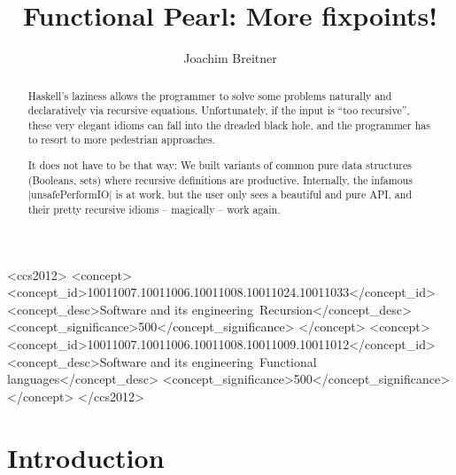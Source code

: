 \documentclass[manuscript,anonymous,screen,acmsmall]{acmart}
\begin{document}
\title{Functional Pearl: More fixpoints!}

\author{Joachim Breitner}


\begin{abstract}
Haskell’s laziness allows the programmer to solve some problems naturally and declaratively via recursive equations. Unfortunately, if the input is “too recursive”, these very elegant idioms can fall into the dreaded black hole, and the programmer has to resort to more pedestrian approaches.

It does not have to be that way: We built variants of common pure data structures (Booleans, sets) where recursive definitions are productive. Internally, the infamous |unsafePerformIO| is at work, but the user only sees a beautiful and pure API, and their pretty recursive idioms -- magically -- work again.

\end{abstract}

\begin{CCSXML}
<ccs2012>
   <concept>
       <concept_id>10011007.10011006.10011008.10011024.10011033</concept_id>
       <concept_desc>Software and its engineering~Recursion</concept_desc>
       <concept_significance>500</concept_significance>
       </concept>
   <concept>
       <concept_id>10011007.10011006.10011008.10011009.10011012</concept_id>
       <concept_desc>Software and its engineering~Functional languages</concept_desc>
       <concept_significance>500</concept_significance>
       </concept>
 </ccs2012>
\end{CCSXML}



\maketitle

\section{Introduction}
\end{document}

